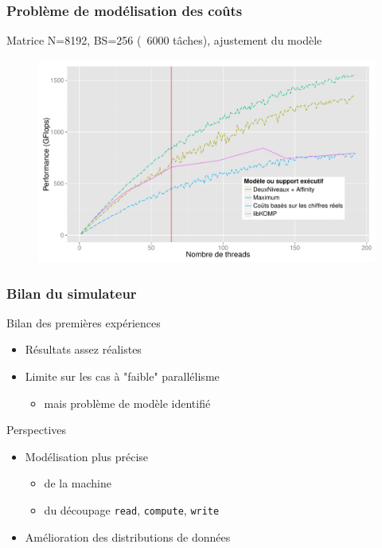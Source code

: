 \documentclass[xcolor={usenames,dvipsnames,svgnames,table}, aspectratio=43]{beamer}
\begin{document}
\begin{frame}
  \frametitle{Problème de modélisation des coûts}
  Matrice N=8192, BS=256 (~6000 tâches), ajustement du modèle
  \begin{figure}
    \includegraphics[width=\textwidth]{graph/simu_affinity_8k_runtime_idchire_ajuste.pdf}%
  \end{figure}


\end{frame}



\begin{frame}[fragile]
  \frametitle{Bilan du simulateur}

  \begin{block}{Bilan des premières expériences}
    \begin{itemize}
      \item Résultats assez réalistes
      \item Limite sur les cas à "faible" parallélisme
      \begin{itemize}
	  \item mais problème de modèle identifié
      \end{itemize}
    \end{itemize}
  \end{block}
  \begin{block}{Perspectives}
    \begin{itemize}
      \item Modélisation plus précise
      \begin{itemize}
	\item de la machine
	\item du découpage \verb/read/, \verb/compute/, \verb/write/
      \end{itemize}
      \item Amélioration des distributions de données
    \end{itemize}
  \end{block}
\end{frame}
\end{document}
